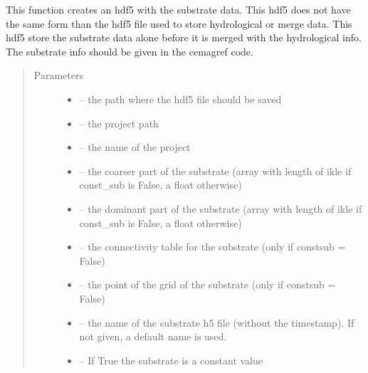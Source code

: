 \documentclass[letterpaper,10pt,english]{sphinxmanual}
\begin{document}
\begin{fulllineitems}
\label{\detokenize{index:src.load_hdf5.save_hdf5_sub}}
This function creates an hdf5 with the substrate data. This hdf5 does not have the same form than the hdf5 file used
to store hydrological or merge data. This hdf5 store the substrate data alone before it is merged with the
hydrological info. The substrate info should be given in the cemagref code.
\begin{quote}\begin{description}
\item[{Parameters}] \leavevmode\begin{itemize}
\item {} 
 -- the path where the hdf5 file should be saved

\item {} 
 -- the project path

\item {} 
 -- the name of the project

\item {} 
 -- the coarser part of the substrate (array with length of ikle if const\_sub is False, a float otherwise)

\item {} 
 -- the dominant part of the substrate (array with length of ikle if const\_sub is False, a float otherwise)

\item {} 
 -- the connectivity table for the substrate (only if constsub = False)

\item {} 
 -- the point of the grid of the substrate (only if constsub = False)

\item {} 
 -- the name of the substrate h5 file (without the timestamp). If not given, a default name is used.

\item {} 
 -- If True the substrate is a constant value


\end{itemize}
\end{description}
\end{quote}
\end{fulllineitems}
\end{document}
